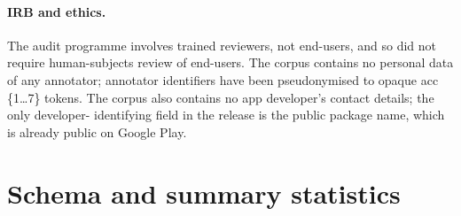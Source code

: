 \documentclass[11pt,a4paper]{article}
\newcommand{\dec}[1]{\textsf{#1}}
\begin{document}
\paragraph{IRB and ethics.}
The audit programme involves trained reviewers, not end-users, and so
did not require human-subjects review of end-users. The corpus
contains no personal data of any annotator; annotator identifiers have
been pseudonymised to opaque \dec{acc \{1\dots7\}} tokens. The corpus
also contains no app developer's contact details; the only developer-
identifying field in the release is the public package name, which is
already public on Google Play.

\section{Schema and summary statistics}\label{sec:schema}
\end{document}
